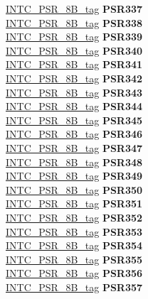 \begin{DoxyCompactItemize}
\begin{tabbing}
\>\>\mbox{\hyperlink{unionINTC__PSR__8B__tag}{INTC\_PSR\_8B\_tag}} {\bfseries PSR337}\\
\>\>\mbox{\hyperlink{unionINTC__PSR__8B__tag}{INTC\_PSR\_8B\_tag}} {\bfseries PSR338}\\
\>\>\mbox{\hyperlink{unionINTC__PSR__8B__tag}{INTC\_PSR\_8B\_tag}} {\bfseries PSR339}\\
\>\>\mbox{\hyperlink{unionINTC__PSR__8B__tag}{INTC\_PSR\_8B\_tag}} {\bfseries PSR340}\\
\>\>\mbox{\hyperlink{unionINTC__PSR__8B__tag}{INTC\_PSR\_8B\_tag}} {\bfseries PSR341}\\
\>\>\mbox{\hyperlink{unionINTC__PSR__8B__tag}{INTC\_PSR\_8B\_tag}} {\bfseries PSR342}\\
\>\>\mbox{\hyperlink{unionINTC__PSR__8B__tag}{INTC\_PSR\_8B\_tag}} {\bfseries PSR343}\\
\>\>\mbox{\hyperlink{unionINTC__PSR__8B__tag}{INTC\_PSR\_8B\_tag}} {\bfseries PSR344}\\
\>\>\mbox{\hyperlink{unionINTC__PSR__8B__tag}{INTC\_PSR\_8B\_tag}} {\bfseries PSR345}\\
\>\>\mbox{\hyperlink{unionINTC__PSR__8B__tag}{INTC\_PSR\_8B\_tag}} {\bfseries PSR346}\\
\>\>\mbox{\hyperlink{unionINTC__PSR__8B__tag}{INTC\_PSR\_8B\_tag}} {\bfseries PSR347}\\
\>\>\mbox{\hyperlink{unionINTC__PSR__8B__tag}{INTC\_PSR\_8B\_tag}} {\bfseries PSR348}\\
\>\>\mbox{\hyperlink{unionINTC__PSR__8B__tag}{INTC\_PSR\_8B\_tag}} {\bfseries PSR349}\\
\>\>\mbox{\hyperlink{unionINTC__PSR__8B__tag}{INTC\_PSR\_8B\_tag}} {\bfseries PSR350}\\
\>\>\mbox{\hyperlink{unionINTC__PSR__8B__tag}{INTC\_PSR\_8B\_tag}} {\bfseries PSR351}\\
\>\>\mbox{\hyperlink{unionINTC__PSR__8B__tag}{INTC\_PSR\_8B\_tag}} {\bfseries PSR352}\\
\>\>\mbox{\hyperlink{unionINTC__PSR__8B__tag}{INTC\_PSR\_8B\_tag}} {\bfseries PSR353}\\
\>\>\mbox{\hyperlink{unionINTC__PSR__8B__tag}{INTC\_PSR\_8B\_tag}} {\bfseries PSR354}\\
\>\>\mbox{\hyperlink{unionINTC__PSR__8B__tag}{INTC\_PSR\_8B\_tag}} {\bfseries PSR355}\\
\>\>\mbox{\hyperlink{unionINTC__PSR__8B__tag}{INTC\_PSR\_8B\_tag}} {\bfseries PSR356}\\
\>\>\mbox{\hyperlink{unionINTC__PSR__8B__tag}{INTC\_PSR\_8B\_tag}} {\bfseries PSR357}\\

\end{tabbing}
\end{DoxyCompactItemize}
